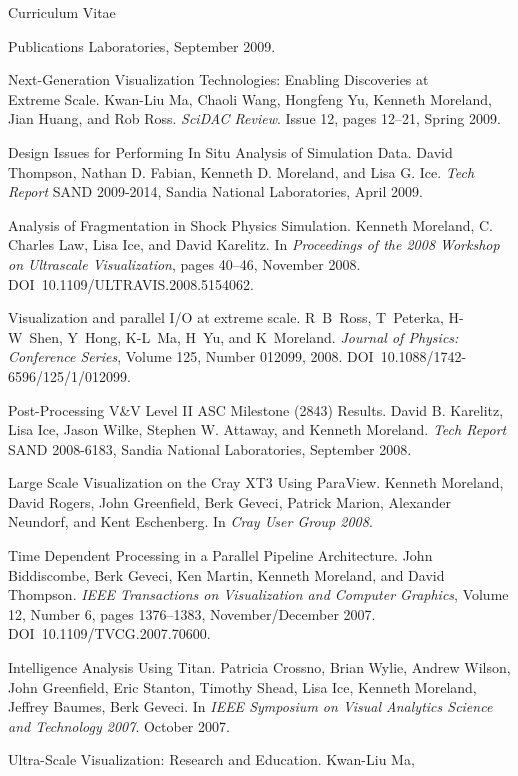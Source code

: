 \documentclass{article}
\begin{document}
\begin{cv}{Curriculum Vitae}
\begin{cvlist}{Publications}
      Laboratories, September 2009.
    \item[Next-Generation Visualization Technologies: Enabling Discoveries
      at]~\\ Extreme Scale. Kwan-Liu Ma, Chaoli Wang, Hongfeng Yu, Kenneth
      Moreland, Jian Huang, and Rob Ross. \emph{SciDAC Review}. Issue 12,
      pages 12--21, Spring 2009.
    \item[Design Issues for Performing In Situ Analysis of Simulation
      Data.] David Thompson, Nathan D. Fabian, Kenneth D. Moreland, and
      Lisa G. Ice. \emph{Tech Report} SAND 2009-2014, Sandia National
      Laboratories, April 2009.
    \item[Analysis of Fragmentation in Shock Physics Simulation.] Kenneth
      Moreland, C. Charles Law, Lisa Ice, and David Karelitz. In
      \emph{Proceedings of the 2008 Workshop on Ultrascale Visualization},
      pages 40--46, November 2008. DOI~10.1109/ULTRAVIS.2008.5154062.
    \item[Visualization and parallel I/O at extreme scale.] R~B~Ross,
      T~Peterka, H-W~Shen, Y~Hong, K-L~Ma, H~Yu, and
      K~Moreland. \emph{Journal of Physics: Conference Series}, Volume 125,
      Number 012099, 2008. DOI~10.1088/1742-6596/125/1/012099.
    \item[Post-Processing V\&V Level II ASC Milestone (2843) Results.] David
      B. Karelitz, Lisa Ice, Jason Wilke, Stephen W. Attaway, and Kenneth
      Moreland. \emph{Tech Report} SAND 2008-6183, Sandia National
      Laboratories, September 2008.
    \item[Large Scale Visualization on the Cray XT3 Using ParaView.]
      Kenneth Moreland, David Rogers, John Greenfield, Berk Geveci, Patrick
      Marion, Alexander Neundorf, and Kent Eschenberg. In \emph{Cray User
        Group 2008}.
    \item[Time Dependent Processing in a Parallel Pipeline Architecture.]
      John Biddiscombe, Berk Geveci, Ken Martin, Kenneth Moreland, and
      David Thompson.  \emph{IEEE Transactions on Visualization and
        Computer Graphics}, Volume 12, Number 6, pages 1376--1383,
      November/December 2007.  DOI~10.1109/TVCG.2007.70600.
    \item[Intelligence Analysis Using Titan.] Patricia Crossno, Brian
      Wylie, Andrew Wilson, John Greenfield, Eric Stanton, Timothy Shead,
      Lisa Ice, Kenneth Moreland, Jeffrey Baumes, Berk Geveci. In
      \emph{IEEE Symposium on Visual Analytics Science and Technology
        2007}. October 2007.
    \item[Ultra-Scale Visualization: Research and Education.] Kwan-Liu Ma,

\end{cvlist}
\end{cv}
\end{document}
